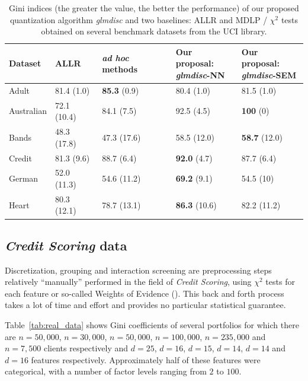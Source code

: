 \begin{table}
    \centering
        \caption{Gini indices (the greater the value, the better the performance) of our proposed quantization algorithm \textit{glmdisc} and two baselines: ALLR and MDLP / $\chi^2$ tests obtained on several benchmark datasets from the UCI library.}
    \label{tab:banchmark}
\begin{small}
\begin{tabular}{lllll}
Dataset & ALLR & \textit{ad hoc} methods & \makecell{Our proposal:\\ \textit{glmdisc}-NN} & \makecell{Our proposal:\\ \textit{glmdisc}-SEM} \\
\hline
Adult & 81.4 (1.0) & \textbf{85.3} (0.9) & 80.4 (1.0) & 81.5 (1.0) \\
Australian & 72.1 (10.4) & 84.1 (7.5) & 92.5 (4.5) & \textbf{100} (0) \\
Bands & 48.3 (17.8) & 47.3 (17.6) & 58.5 (12.0) & \textbf{58.7} (12.0) \\
Credit & 81.3 (9.6) & 88.7 (6.4) & \textbf{92.0} (4.7) & 87.7 (6.4) \\
German & 52.0 (11.3) & 54.6 (11.2) & \textbf{69.2} (9.1) & 54.5 (10) \\
Heart & 80.3 (12.1) & 78.7 (13.1) & \textbf{86.3} (10.6) & 82.2 (11.2) 
\end{tabular}
\end{small}
\end{table}

\subsection{\textit{Credit Scoring} data} \label{subsec:exp_real}


Discretization, grouping and interaction screening are preprocessing steps relatively ``manually'' performed in the field of \textit{Credit Scoring}, using $\chi^2$ tests for each feature or so-called Weights of Evidence (\cite{zeng2014necessary}). This back and forth process takes a lot of time and effort and provides no particular statistical guarantee.

Table~\ref{tab:real_data} shows Gini coefficients of several portfolios for which there are $n=50,000$, $n=30,000$, $n=50,000$, $n=100,000$, $n=235,000$ and $n=7,500$ clients respectively and $d=25$, $d=16$, $d=15$, $d=14$, $d=14$ and $d=16$ features respectively. Approximately half of these features were categorical, with a number of factor levels ranging from $2$ to $100$. 

